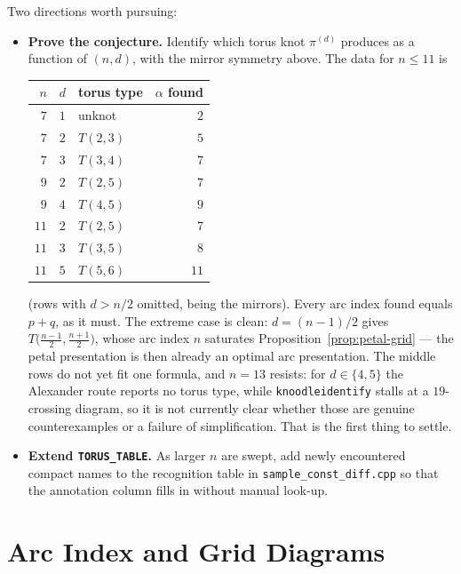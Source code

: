 \documentclass[11pt,oneside]{report}
\theoremstyle{definition}
\begin{document}
Two directions worth pursuing:
\begin{itemize}[leftmargin=2em]
\item \textbf{Prove the conjecture.} Identify which torus knot
$\pi^{(d)}$ produces as a function of $(n, d)$, with the mirror
symmetry above. The data for $n \leq 11$ is

\begin{center}
\begin{tabular}{@{}rllr@{}}
\hline
$n$ & $d$ & torus type & $\alpha$ found \\
\hline
$7$  & $1$ & unknot   & $2$  \\
$7$  & $2$ & $T(2,3)$ & $5$  \\
$7$  & $3$ & $T(3,4)$ & $7$  \\
$9$  & $2$ & $T(2,5)$ & $7$  \\
$9$  & $4$ & $T(4,5)$ & $9$  \\
$11$ & $2$ & $T(2,5)$ & $7$  \\
$11$ & $3$ & $T(3,5)$ & $8$  \\
$11$ & $5$ & $T(5,6)$ & $11$ \\
\hline
\end{tabular}
\end{center}

\noindent
(rows with $d > n/2$ omitted, being the mirrors). Every arc index found
equals $p + q$, as it must. The extreme case is clean: $d = (n-1)/2$
gives $T\bigl(\tfrac{n-1}{2}, \tfrac{n+1}{2}\bigr)$, whose arc index
$n$ saturates Proposition~\ref{prop:petal-grid} --- the petal
presentation is then already an optimal arc presentation. The middle
rows do not yet fit one formula, and $n = 13$ resists: for
$d \in \{4,5\}$ the Alexander route reports no torus type, while
\texttt{knoodleidentify} stalls at a $19$-crossing diagram, so it is not
currently clear whether those are genuine counterexamples or a failure of
simplification. That is the first thing to settle.
\item \textbf{Extend \texttt{TORUS\_TABLE}.} As larger $n$ are swept,
add newly encountered compact names to the recognition table in
\texttt{sample\_const\_diff.cpp} so that the annotation column fills
in without manual look-up.
\end{itemize}

\chapter{Arc Index and Grid Diagrams}\label{chap:arcindex}
\end{document}
